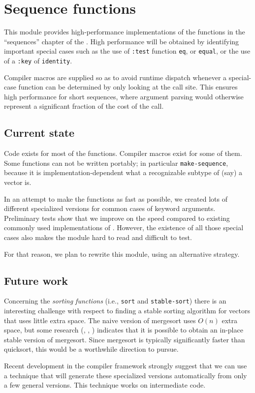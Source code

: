 \chapter{Sequence functions}

This module provides high-performance implementations of the
functions in the ``sequences'' chapter of the \hs{}.  High
performance will be obtained by identifying important special cases
such as the use of \texttt{:test} function \texttt{eq}, or
\texttt{equal}, or the use of a \texttt{:key} of \texttt{identity}. 

Compiler macros are supplied so as to avoid runtime dispatch
whenever a special-case function can be determined by only looking at
the call site.  This ensures high performance for short sequences,
where argument parsing would otherwise represent a significant
fraction of the cost of the call.

\section{Current state}

Code exists for most of the functions.  Compiler macros exist for some
of them.  Some functions can not be written portably; in particular
\texttt{make-sequence}, because it is implementation-dependent what a
recognizable subtype of (say) a vector is.

In an attempt to make the functions as fast as possible, we created
lots of different specialized versions for common cases of keyword
arguments.  Preliminary tests show that we improve on the speed
compared to existing commonly used implementations of \commonlisp{}.  However,
the existence of all those special cases also makes the module hard to
read and difficult to test.  

For that reason, we plan to rewrite this module, using an alternative
strategy. 

\section{Future work}
\label{sec-sequence-functions-future-work}

Concerning the \emph{sorting functions} (i.e., \texttt{sort} and
\texttt{stable-sort}) there is an interesting challenge with respect
to finding a stable sorting algorithm for vectors that uses little
extra space.  The naive version of mergesort uses $O(n)$ extra space,
but some research (\cite{Huang:1990:FSM:898863},
\cite{Huang:1988:PIM:42392.42403},
\cite{Katajainen:1996:PIM:642136.642138}) indicates that it is
possible to obtain an in-place stable version of mergesort.   Since
mergesort is typically significantly faster than quicksort, this would
be a worthwhile direction to pursue.

Recent development in the \cleavir{} compiler framework
strongly suggest that we can use a technique that will generate these
specialized versions automatically from only a few general versions.
This technique works on intermediate code.
